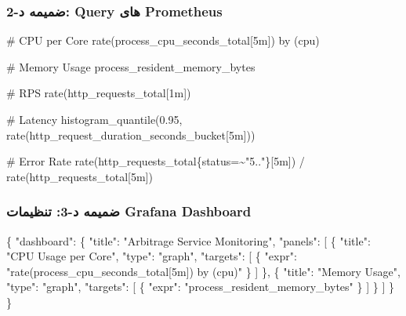 \documentclass[
]{article}
\newenvironment{Shaded}{}{}
\newcommand{\DataTypeTok}[1]{\textcolor[rgb]{0.56,0.13,0.00}{#1}}
\newcommand{\FunctionTok}[1]{\textcolor[rgb]{0.02,0.16,0.49}{#1}}
\newcommand{\NormalTok}[1]{#1}
\newcommand{\OtherTok}[1]{\textcolor[rgb]{0.00,0.44,0.13}{#1}}
\newcommand{\StringTok}[1]{\textcolor[rgb]{0.25,0.44,0.63}{#1}}
\begin{document}
\subsubsection{ضمیمه د-2: Query های
Prometheus}\label{ux636ux645ux6ccux645ux647-ux62f-2-query-ux647ux627ux6cc-prometheus}

\begin{Shaded}
\begin{Highlighting}[]
\NormalTok{\# CPU per Core}
\NormalTok{rate(process\_cpu\_seconds\_total[5m]) by (cpu)}

\NormalTok{\# Memory Usage}
\NormalTok{process\_resident\_memory\_bytes}

\NormalTok{\# RPS}
\NormalTok{rate(http\_requests\_total[1m])}

\NormalTok{\# Latency}
\NormalTok{histogram\_quantile(0.95, rate(http\_request\_duration\_seconds\_bucket[5m]))}

\NormalTok{\# Error Rate}
\NormalTok{rate(http\_requests\_total\{status=\textasciitilde{}"5.."\}[5m]) / rate(http\_requests\_total[5m])}
\end{Highlighting}
\end{Shaded}

\subsubsection{ضمیمه د-3: تنظیمات Grafana
Dashboard}\label{ux636ux645ux6ccux645ux647-ux62f-3-ux62aux646ux638ux6ccux645ux627ux62a-grafana-dashboard}

\begin{Shaded}
\begin{Highlighting}[]
\FunctionTok{\{}
  \DataTypeTok{"dashboard"}\FunctionTok{:} \FunctionTok{\{}
    \DataTypeTok{"title"}\FunctionTok{:} \StringTok{"Arbitrage Service Monitoring"}\FunctionTok{,}
    \DataTypeTok{"panels"}\FunctionTok{:} \OtherTok{[}
      \FunctionTok{\{}
        \DataTypeTok{"title"}\FunctionTok{:} \StringTok{"CPU Usage per Core"}\FunctionTok{,}
        \DataTypeTok{"type"}\FunctionTok{:} \StringTok{"graph"}\FunctionTok{,}
        \DataTypeTok{"targets"}\FunctionTok{:} \OtherTok{[}
          \FunctionTok{\{}
            \DataTypeTok{"expr"}\FunctionTok{:} \StringTok{"rate(process\_cpu\_seconds\_total[5m]) by (cpu)"}
          \FunctionTok{\}}
        \OtherTok{]}
      \FunctionTok{\}}\OtherTok{,}
      \FunctionTok{\{}
        \DataTypeTok{"title"}\FunctionTok{:} \StringTok{"Memory Usage"}\FunctionTok{,}
        \DataTypeTok{"type"}\FunctionTok{:} \StringTok{"graph"}\FunctionTok{,}
        \DataTypeTok{"targets"}\FunctionTok{:} \OtherTok{[}
          \FunctionTok{\{}
            \DataTypeTok{"expr"}\FunctionTok{:} \StringTok{"process\_resident\_memory\_bytes"}
          \FunctionTok{\}}
        \OtherTok{]}
      \FunctionTok{\}}
    \OtherTok{]}
  \FunctionTok{\}}
\FunctionTok{\}}
\end{Highlighting}
\end{Shaded}
\end{document}
